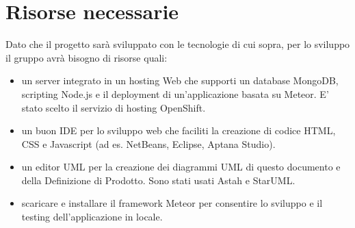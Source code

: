 \section{Risorse necessarie}
	Dato che il progetto sarà sviluppato con le tecnologie di cui sopra, per lo sviluppo il gruppo avrà bisogno di risorse quali:
	\begin{itemize}
	\item un server integrato in un hosting Web che supporti un database MongoDB, scripting Node.js e il deployment di un'applicazione basata su Meteor. E' stato scelto il servizio di hosting OpenShift.
	\item un buon IDE per lo sviluppo web che faciliti la creazione di codice HTML, CSS e Javascript (ad es. NetBeans, Eclipse, Aptana Studio).
	\item un editor UML per la creazione dei diagrammi UML  di questo documento e della Definizione di Prodotto. Sono stati usati Astah e StarUML.
	\item scaricare e installare il framework Meteor per consentire lo sviluppo e il testing dell'applicazione in locale.
	\end{itemize}
	\newpage